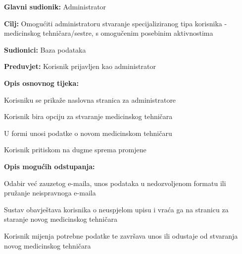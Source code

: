 					\noindent {}
					\begin{packed_item}
	
						\item \textbf{Glavni sudionik: } Administrator
						\item  \textbf{Cilj:} Omogućiti administratoru stvaranje specijaliziranog tipa korisnika - medicinskog tehničara/sestre, s omogučenim posebinim aktivnostima
						\item  \textbf{Sudionici:} Baza podataka
						\item  \textbf{Preduvjet:} Korisnik prijavljen kao administrator
						\item  \textbf{Opis osnovnog tijeka:}
						
						\item[] \begin{packed_enum}
	
							\item Korisniku se prikaže naslovna stranica za administratore
							\item Korisnik bira opciju za stvaranje medicinskog tehničara
							\item U formi unosi podatke o novom medicinskom tehničaru
							\item Korisnik pritiskom na dugme sprema promjene
							
						\end{packed_enum}
						
						\item  \textbf{Opis mogućih odstupanja:}
							
						\item[] \begin{packed_item}
						
							\item[2.a] Odabir već zauzetog e-maila, unos podataka u nedozvoljenom formatu ili pružanje neispravnoga e-maila 
							\item[] \begin{packed_enum}
								
								\item Sustav obavještava korisnika o neuspjelom upisu i vraća ga na stranicu za staranje novog medicinskog tehničara
								\item Korisnik mijenja potrebne podatke te završava unos ili odustaje od stvaranja novog medicinskog tehničara
								
							\end{packed_enum}
						\end{packed_item}
					\end{packed_item}
					
